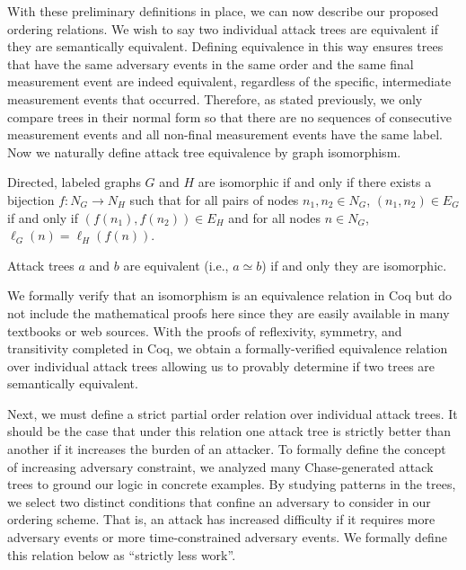 \documentclass[runningheads]{llncs}
\theoremstyle{definition}
\begin{document}
With these preliminary definitions in place, we can now describe our proposed ordering relations. We wish to say two individual attack trees are equivalent if they are semantically equivalent. Defining equivalence in this way ensures trees that have the same adversary events in the same order and the same final measurement event are indeed equivalent, regardless of the specific, intermediate measurement events that occurred. Therefore, as stated previously, we only compare trees in their normal form so that there are no sequences of consecutive measurement events and all non-final measurement events have the same label. Now we naturally define attack tree equivalence by graph isomorphism.


\begin{definition}[Isomorphism]
    Directed, labeled graphs $G$ and $H$ are isomorphic if and only if there exists a bijection $f : N_G \to N_H$ such that for all pairs of nodes $n_1, n_2 \in N_G$, $(n_1,n_2) \in E_G$ if and only if $(f(n_1),f(n_2)) \in E_H$ and for all nodes $n \in N_G$, $\ell_G(n) = \ell_H(f(n))$.
\end{definition}


\begin{definition}
  Attack trees $a$ and $b$ are equivalent (i.e., $a \simeq b$) if and only they are isomorphic.
\end{definition}


\noindent We formally verify that an isomorphism is an equivalence relation in Coq but do not include the mathematical proofs here since they are easily available in many textbooks or web sources. With the proofs of reflexivity, symmetry, and transitivity completed in Coq, we obtain a formally-verified equivalence relation over individual attack trees allowing us to provably determine if two trees are semantically equivalent.


Next, we must define a strict partial order relation over individual attack trees. It should be the case that under this relation one attack tree is strictly better than another if it increases the burden of an attacker. To formally define the concept of increasing adversary constraint, we analyzed many Chase-generated attack trees to ground our logic in concrete examples. By studying patterns in the trees, we select two distinct conditions that confine an adversary to consider in our ordering scheme. That is, an attack has increased difficulty if it requires more adversary events or more time-constrained adversary events. We formally define this relation below as ``strictly less work''.
\end{document}
